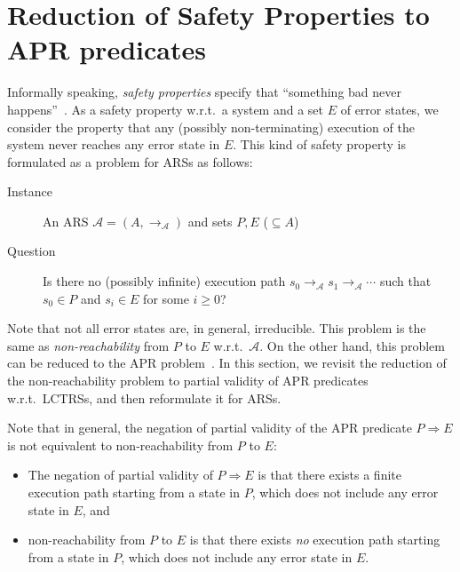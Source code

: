 \documentclass[10pt,a4paper]{article}
\def\cA{\mathcal{A}}
\newcommand{\ReachPred}[2]{#1 \Rightarrow #2}
\begin{document}
\section{Reduction of Safety Properties to APR predicates}
\label{sec:reduction-of-safety-properties-to-APR}

Informally speaking, \emph{safety properties} specify that ``something bad never happens''~\cite[Section~3.3.2]{BK08}.
As a safety property w.r.t.\ a system and a set $E$ of error states, we consider the property that
any (possibly non-terminating) execution of the system never reaches any error state in $E$.
This kind of safety property is formulated as a problem for ARSs as follows:
\begin{description}
	\item[Instance] An ARS $\cA=(A,\to_\cA)$ and sets $P,E$ ($\subseteq A$)
	\item[Question] Is there no (possibly infinite) execution path $s_0 \to_\cA s_1 \to_\cA \cdots$ such that $s_0 \in P$ and
	      $s_i \in E$ for some $i \geq 0$?
\end{description}
Note that not all error states are, in general, irreducible.
This problem is the same as \emph{non-reachability} from $P$ to $E$ w.r.t.\ $\cA$.
On the other hand, this problem can be reduced to the APR problem~\cite{KN23jlamp}.
In this section, we revisit the reduction
of the non-reachability problem
to partial validity of APR predicates w.r.t.\ LCTRSs, and then reformulate it for ARSs.

Note that in general, the negation of partial validity of the APR predicate $\ReachPred{P}{E}$ is not equivalent to non-reachability from $P$ to $E$:
\begin{itemize}
	\item The negation of partial validity of $\ReachPred{P}{E}$ is that
	      there exists a finite execution path starting from a state in $P$, which does not include any error state in $E$, and
	\item non-reachability from $P$ to $E$ is that
	      there exists \emph{no} execution path starting from a state in $P$, which does not include any error state in $E$.
\end{itemize}
\end{document}
